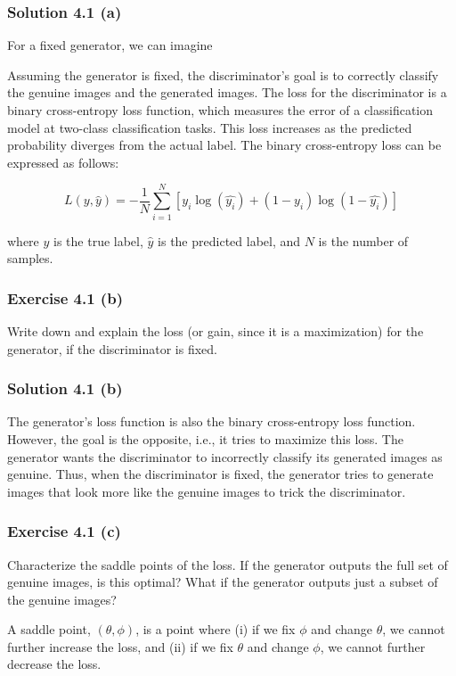 \documentclass[
10pt, %
a4paper, %
oneside, %
headinclude,footinclude, %
BCOR5mm, %
]{scrartcl}
\begin{document}
\subsubsection*{Solution 4.1 (a)}
For a fixed generator, we can imagine

Assuming the generator is fixed, the discriminator's goal is to correctly classify the genuine images and the generated images. The loss for the discriminator is a binary cross-entropy loss function, which measures the error of a classification model at two-class classification tasks. This loss increases as the predicted probability diverges from the actual label. The binary cross-entropy loss can be expressed as follows:

\begin{equation}
L(y,\hat{y}) = - \frac{1}{N} \sum_{i=1}^{N} [y_i \log(\hat{y_i}) + (1-y_i) \log(1-\hat{y_i})]
\end{equation}

where $y$ is the true label, $\hat{y}$ is the predicted label, and $N$ is the number of samples.

\subsubsection*{Exercise 4.1 (b)}
Write down and explain the loss (or gain, since it is a maximization) for the generator, if the discriminator is fixed.

\subsubsection*{Solution 4.1 (b)}
The generator's loss function is also the binary cross-entropy loss function. However, the goal is the opposite, i.e., it tries to maximize this loss. The generator wants the discriminator to incorrectly classify its generated images as genuine. Thus, when the discriminator is fixed, the generator tries to generate images that look more like the genuine images to trick the discriminator.

\subsubsection*{Exercise 4.1 (c)}
Characterize the saddle points of the loss. If the generator outputs the full set of genuine images, is this optimal? What if the generator outputs just a subset of the genuine images?

A saddle point, $(\theta, \phi)$, is a point where (i) if we fix $\phi$ and change $\theta$, we cannot further increase the loss, and (ii) if we fix $\theta$ and change $\phi$, we cannot further decrease the loss.
\end{document}

